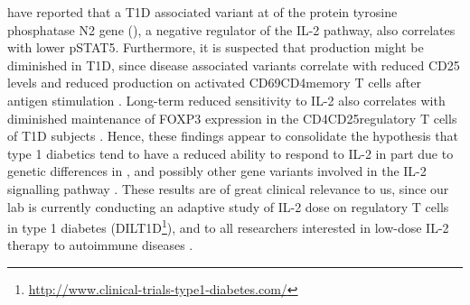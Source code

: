 \citet{Long:2011hk} have reported that a \Gls{T1D} associated variant at 
of the protein tyrosine phosphatase N2 gene (),
a negative regulator of the IL-2 pathway,
also correlates with lower pSTAT5.
Furthermore, it is suspected that  production might be diminished in T1D, since disease associated  variants correlate with reduced CD25 levels and reduced  production on activated CD69\positive CD4\positive memory T cells after antigen stimulation \citep{Dendrou:2009dv}.
Long-term reduced sensitivity to IL-2 also correlates with diminished maintenance of FOXP3 expression in the CD4\positive CD25\positive regulatory T cells of \gls{T1D} subjects \citep{Long:2010ej}.
Hence, these findings appear to consolidate the hypothesis that type 1 diabetics tend to have a reduced ability to respond to IL-2
in part due to genetic differences in ,  and possibly other gene variants involved in the IL-2 signalling pathway
\citep{Long:2010ej,Long:2011hk,Long:2012ea}.
These results are of great clinical relevance to us, since our lab is currently conducting an adaptive study of IL-2 dose on regulatory T cells in type 1 diabetes (DILT1D\footnote{\url{http://www.clinical-trials-type1-diabetes.com/}}), and to all researchers interested in low-dose IL-2 therapy to autoimmune diseases \citep{Koreth:2011kv,Saadoun:2011em}.

